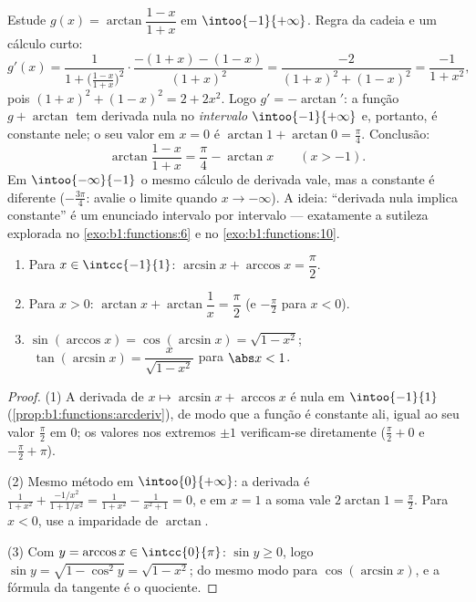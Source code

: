\begin{example}\label{ex:b1:functions:hiddenconst}
Estude $g(x) = \arctan\dfrac{1 - x}{1 + x}$ em $\intoo{-1}
{+\infty}$. Regra da cadeia e um cálculo curto:
\[
g'(x) = \frac{1}{1 + \bigl(\frac{1-x}{1+x}\bigr)^2}\cdot
\frac{-(1+x) - (1-x)}{(1+x)^2}
= \frac{-2}{(1+x)^2 + (1-x)^2}
= \frac{-1}{1 + x^2} ,
\]
pois $(1+x)^2 + (1-x)^2 = 2 + 2x^2$. Logo $g' = -\arctan'$: a
função $g + \arctan$ tem derivada nula no \emph{intervalo}
$\intoo{-1}{+\infty}$ e, portanto, é constante nele; o seu valor em $x =
0$ é $\arctan 1 + \arctan 0 = \frac\pi4$. Conclusão:
\[
\arctan\frac{1 - x}{1 + x} = \frac\pi4 - \arctan x
\qquad (x > -1) .
\]
Em $\intoo{-\infty}{-1}$ o mesmo cálculo de derivada vale, mas
a constante é diferente ($-\frac{3\pi}4$: avalie o limite quando
$x \to -\infty$). A ideia: ``derivada nula implica
constante'' é um enunciado intervalo por intervalo --- exatamente a
sutileza explorada no \cref{exo:b1:functions:6} e no
\cref{exo:b1:functions:10}.
\end{example}

\begin{proposition}\label{prop:b1:functions:arcidentities}
\begin{enumerate}
  \item Para $x \in \intcc{-1}{1}$: $\arcsin x + \arccos x =
        \dfrac{\pi}{2}$.
  \item Para $x > 0$: $\arctan x + \arctan\dfrac 1x = \dfrac{\pi}{2}$
        (e $-\frac\pi2$ para $x < 0$).
  \item $\sin(\arccos x) = \cos(\arcsin x) = \sqrt{1 - x^2}$;
        $\;\tan(\arcsin x) = \dfrac{x}{\sqrt{1 - x^2}}$ para
        $\abs x < 1$.
\end{enumerate}
\end{proposition}

\begin{proof}
(1) A derivada de $x \mapsto \arcsin x + \arccos x$ é nula em
$\intoo{-1}{1}$ (\cref{prop:b1:functions:arcderiv}), de modo que a função
é constante ali, igual ao seu valor $\frac\pi2$ em $0$; os valores nos
extremos $\pm 1$ verificam-se diretamente ($\frac\pi2 + 0$ e $-\frac\pi2 +
\pi$).

(2) Mesmo método em $\intoo{0}{+\infty}$: a derivada é
$\frac{1}{1+x^2} + \frac{-1/x^2}{1 + 1/x^2} = \frac{1}{1+x^2} -
\frac{1}{x^2 + 1} = 0$, e em $x = 1$ a soma vale $2\arctan 1 =
\frac\pi2$. Para $x < 0$, use a imparidade de $\arctan$.

(3) Com $y = \arccos x \in \intcc{0}{\pi}$: $\sin y \geq 0$, logo
$\sin y = \sqrt{1 - \cos^2 y} = \sqrt{1 - x^2}$; do mesmo modo para
$\cos(\arcsin x)$, e a fórmula da tangente é o quociente.
\end{proof}

